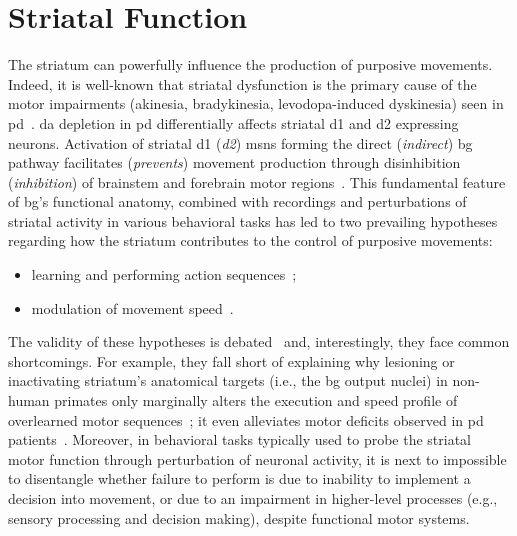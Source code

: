 \section{Striatal Function}
\label{ch:disscusion:lesion}

The striatum can powerfully influence the production of purposive movements.
Indeed, it is well-known that striatal dysfunction is the primary cause of the motor impairments (akinesia, bradykinesia, levodopa-induced dyskinesia) seen in \gls{pd}~\cite{Mink1996,Hornykiewicz2006,McGregor2019Neuron}.
\Gls{da} depletion in \gls{pd} differentially affects striatal \gls{d1} and \gls{d2} expressing neurons.
Activation of striatal \gls{d1} (\textit{\gls{d2}}) \glspl{msn} forming the direct (\textit{indirect}) \gls{bg} pathway facilitates (\textit{prevents}) movement production through disinhibition (\textit{inhibition}) of brainstem and forebrain motor regions~\cite{Kravitz2010Nature}.
This fundamental feature of \gls{bg}'s functional anatomy, combined with recordings and perturbations of striatal activity in various behavioral tasks has led to two prevailing hypotheses regarding how the striatum contributes to the control of purposive movements: %
\begin{itemize}[noitemsep]
    \item learning and performing action sequences\footnotemark~\cite{Barnes2005Nature, Jin2010N, Cui2013Nature, Klaus2017Neuron, Markowitz2018Cell};
    \item  modulation of movement speed~\cite{Kim2014EJN, Rueda2015NN, Barbera2016Neuron, Yttri2016Nature, Panigrahi2015Cell}.
\end{itemize}
The validity of these hypotheses is debated~\cite[for instance, see][]{Dudman2016CurrOpinNeurobiol} and, interestingly, they face common shortcomings.
For example, they fall short of explaining why lesioning or inactivating striatum's anatomical targets (i.e., the \gls{bg} output nuclei) in non-human primates only marginally alters the execution and speed profile of overlearned motor sequences~\cite{Desmurget2010JNeurosci}; it even alleviates motor deficits observed in \gls{pd} patients~\cite{Turner2010CurrOpinNeurobiol}.
Moreover, in behavioral tasks typically used to probe the striatal motor function through perturbation of neuronal activity, it is next to impossible to disentangle whether failure to perform is due to inability to implement a decision into movement, or due to an impairment in higher-level processes (e.g., sensory processing and decision making), despite functional motor systems.\footnotemark
